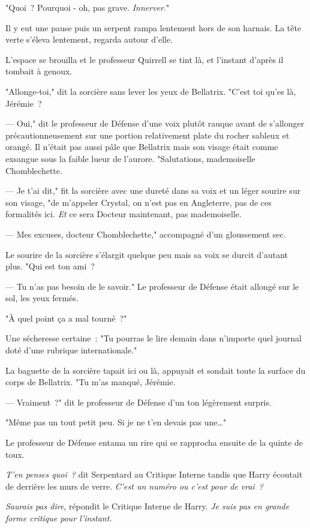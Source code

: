 "Quoi~? Pourquoi - oh, pas grave. \emph{Innerver}."

Il y eut une pause puis un serpent rampa lentement hors de son harnais. La tête verte s'éleva lentement, regarda autour d'elle.

L'espace se brouilla et le professeur Quirrell se tint là, et l'instant d'après il tombait à genoux.

"Allonge-toi," dit la sorcière sans lever les yeux de Bellatrix. "C'est toi qu'es là, Jérémie~?

--- Oui," dit le professeur de Défense d'une voix plutôt rauque avant de s'allonger précautionneusement sur une portion relativement plate du rocher sableux et orangé. Il n'était pas aussi pâle que Bellatrix mais son visage était comme exsangue sous la faible lueur de l'aurore. "Salutations, mademoiselle Chomblechette.

--- Je t'ai dit," fit la sorcière avec une dureté dans sa voix et un léger sourire sur son visage, "de m'appeler Crystal, on n'est pas en Angleterre, pas de ces formalités ici. \emph{Et} ce sera Docteur maintenant, pas mademoiselle.

--- Mes excuses, docteur Chomblechette," accompagné d'un gloussement sec.

Le sourire de la sorcière s'élargit quelque peu mais sa voix se durcit d'autant plus. "Qui est ton ami~?

--- Tu n'as pas besoin de le savoir." Le professeur de Défense était allongé sur le sol, les yeux fermés.

"À quel point ça a mal tourné~?"

Une sécheresse certaine~: "Tu pourras le lire demain dans n'importe quel journal doté d'une rubrique internationale."

La baguette de la sorcière tapait ici ou là, appuyait et sondait toute la surface du corps de Bellatrix. "Tu m'as manqué, Jérémie.

--- Vraiment~?" dit le professeur de Défense d'un ton légèrement surpris.

"Même pas un tout petit peu. Si je ne t'en devais pas une…"

Le professeur de Défense entama un rire qui se rapprocha ensuite de la quinte de toux.

\emph{T'en penses quoi~?} dit Serpentard au Critique Interne tandis que Harry écoutait de derrière les murs de verre. \emph{C'est un numéro ou c'est pour de vrai~?}

\emph{Saurais pas dire}, répondit le Critique Interne de Harry. \emph{Je suis pas en grande forme critique pour l'instant.}

